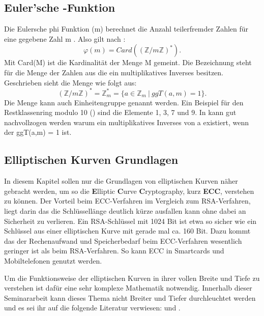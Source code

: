 		\subsection{Euler’sche \myPhi -Funktion}
			Die Eulersche phi Funktion \myPhi(m) berechnet die Anzahl teilerfremder Zahlen für eine gegebene Zahl m . Also gilt nach \cite{Algorithmische:Zahlentheorie}: 
			\begin{displaymath}
				\varphi(m) = Card((\mathbb{Z}/m\mathbb{Z})^*).
			\end{displaymath}			
			Mit Card(M) ist die Kardinalität der Menge M gemeint. Die Bezeichnung  steht für die Menge der Zahlen aus  die ein multiplikatives Inverses besitzen. Geschrieben sieht die Menge wie folgt aus:
			\begin{displaymath}
				(\mathbb{Z}/m\mathbb{Z})^* = \mathbb{Z}_m^* = \{a \in \mathbb{Z}_m ~|~ggT(a,m) = 1\}.
			\end{displaymath}
			Die Menge  kann auch Einheitengruppe genannt werden. Ein Beispiel für den Restklassenring modulo 10 () sind die Elemente 1, 3, 7 und 9. In \cite{Mathematik:fuer:Informatiker} kann gut nachvollzogen werden warum ein multiplikatives Inverses von a existiert, wenn der ggT(a,m) = 1 ist.
		
	\subsection{Elliptischen Kurven Grundlagen}\label{Elliptischen Kurven Grundlagen}
		In diesem Kapitel sollen nur die Grundlagen von elliptischen Kurven näher gebracht werden, um so die \textbf{E}lliptic \textbf{C}urve \textbf{C}ryptography, kurz \textbf{ECC}, verstehen zu können. Der Vorteil beim ECC-Verfahren im Vergleich zum RSA-Verfahren, liegt darin das die Schlüssellänge deutlich kürze ausfallen kann ohne dabei an Sicherheit zu verlieren. Ein RSA-Schlüssel mit 1024 Bit ist etwa so sicher wie ein Schlüssel aus einer elliptischen Kurve mit gerade mal ca. 160 Bit. Dazu kommt das der Rechenaufwand und Speicherbedarf beim ECC-Verfahren wesentlich geringer ist als beim RSA-Verfahren. So kann ECC in Smartcards und Mobiltelefonen genutzt werden.\cite{Information:und:Kommunikation}
		
		Um die Funktionsweise der elliptischen Kurven in ihrer vollen Breite und Tiefe zu verstehen ist dafür eine sehr komplexe Mathematik notwendig. Innerhalb dieser Seminararbeit kann dieses Thema nicht Breiter und Tiefer durchleuchtet werden und es sei ihr auf die folgende Literatur verwiesen: \cite{Information:und:Kommunikation} und \cite{Kryptographie:und:IT-Sicherheit}.
		
